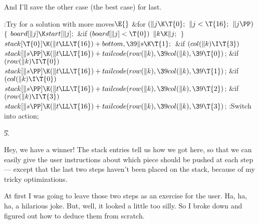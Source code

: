 And I'll save the other case (the best case) for last.

\Y\B\4:Try for a solution with  more moves\X${}\E{}$\6
\&{for} ${}(\|j\K\T{0};{}$ ${}\|j<\T{16};{}$ ${}\|j\PP){}$\5
${}\{{}$\1\6
${}\\{board}[\|j]\K\\{start}[\|j];{}$\6
\&{if} ${}(\\{board}[\|j]<\T{0}){}$\1\5
${}\|k\K\|j;{}$\2\6
\4${}\}{}$\2\6
${}\\{stack}[\T{0}]\K(\|t\LL\T{16})+\\{bottom},\39\|s\K\T{1};{}$\6
\&{if} ${}(\\{col}(\|k)\I\T{3}){}$\1\5
${}\\{stack}[\|s\PP]\K(\|t\LL\T{16})+\\{tailcode}(\\{row}(\|k),\39\\{col}(\|k),%
\39\T{0}){}$;\2\6
\&{if} ${}(\\{row}(\|k)\I\T{0}){}$\1\5
${}\\{stack}[\|s\PP]\K(\|t\LL\T{16})+\\{tailcode}(\\{row}(\|k),\39\\{col}(\|k),%
\39\T{1}){}$;\2\6
\&{if} ${}(\\{col}(\|k)\I\T{0}){}$\1\5
${}\\{stack}[\|s\PP]\K(\|t\LL\T{16})+\\{tailcode}(\\{row}(\|k),\39\\{col}(\|k),%
\39\T{2}){}$;\2\6
\&{if} ${}(\\{row}(\|k)\I\T{3}){}$\1\5
${}\\{stack}[\|s\PP]\K(\|t\LL\T{16})+\\{tailcode}(\\{row}(\|k),\39\\{col}(\|k),%
\39\T{3}){}$;\2\6
:Switch into action\X;\par
\U5.\fi

Hey, we have a winner! The stack entries tell us how we got here,
so that we can easily give the user instructions about which piece
should be pushed at each step --- except that the last two steps haven't
been placed on the stack, because of my tricky optimizations.

At first I was going to leave those two steps as an exercise
for the user. Ha, ha, ha, a hilarious joke.
But, well, it looked a little too silly.
So I broke down and figured out how to deduce them from scratch.

